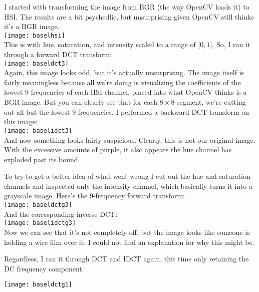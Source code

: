 \documentclass[12pt]{article}
\begin{document}
I started with transforming the image from BGR (the way OpenCV loads it) to HSI.
The results are a bit psychedlic, but unsurprising given OpenCV still thinks
it's a BGR image.\\

\texttt{[image: baselhsi]}\\

This is with hue, saturation, and intensity scaled to a range of $\lbrack0,
1\rbrack$. So, I ran it through a forward DCT transform:\\

\texttt{[image: baseldct3]}\\

Again, this image looks odd, but it's actually unsurprising. The image itself is
fairly meaningless because all we're doing is visualizing the coefficients of
the lowest 9 frequencies of each HSI channel, placed into what OpenCV thinks is
a BGR image. But you can clearly see that for each $8\times8$ segment, we're cutting
out all but the lowest 9 frequencies. I performed a backward DCT
transform on this image:\\

\texttt{[image: baselidct3]}\\

And now something looks fairly suspicious. Clearly, this is not our original
image. With the excessive amounts of purple, it also appears the hue channel has
exploded past its bound.

To try to get a better idea of what went wrong I cut out the hue and saturation channels and
inspected only the intensity channel, which basically turns it into a grayscale
image. Here's the 9-frequency forward transform:\\

\texttt{[image: baseldctg3]}\\

And the corresponding inverse DCT:\\

\texttt{[image: baselidctg3]}\\

Now we can see that it's not completely off, but the image looks like someone is
holding a wire film over it. I could not find an explanation for why this might
be.

Regardless, I ran it through DCT and IDCT again, this time only retaining the DC
frequency component:

\texttt{[image: baseldctg1]}\\
\end{document}
